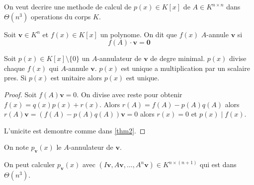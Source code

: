 On veut decrire une methode de calcul de $p(x)\in K[x]$ de $A\in K^{n\times n}$ dans $\Theta(n^{3})$ operations du corps $K$.
\begin{definition}
Soit $\boldsymbol{v}\in K^{n}$ et $f(x)\in K[x]$ un polynome. On dit que $f(x)$ $A$-annule $\boldsymbol{v}$ si 
$$
f(A)\cdot \boldsymbol{v}=\boldsymbol{0}
$$
\end{definition}
\begin{theorem}
Soit $p(x)\in K[x]\setminus \{ 0 \}$ un $A$-annulateur de $\boldsymbol{v}$ de degre minimal. $p(x)$ divise chaque $f(x)$ qui $A$-annule $\boldsymbol{v}$. $p(x)$ est unique a multiplication par un scalaire pres. Si $p(x)$ est unitaire alors $p(x)$ est unique. 
\end{theorem}

\begin{proof}
Soit $f(A)\boldsymbol{v}=0$. On divise avec reste pour obtenir $f(x)=q(x)p(x)+r(x)$. Alors $r(A)=f(A)-p(A)q(A)$ alors $r(A)\boldsymbol{v}=(f(A)-p(A)q(A))\boldsymbol{v}=0$ alors $r(x)=0$ et $p(x)\mid f(x)$.

L'unicite est demontre comme dans \ref{thm2}.
\end{proof}

\begin{notation}
On note $p_{\boldsymbol{v}}(x)$ le $A$-annulateur de $\boldsymbol{v}$.
\end{notation}
\begin{remark}
On peut calculer $p_{\boldsymbol{v}}(x)$ avec $(I\boldsymbol{v},A\boldsymbol{v},\dots,A^{n}\boldsymbol{v})\in K^{n\times(n+1)}$ qui est dans $\Theta(n^{3})$.
\end{remark}

